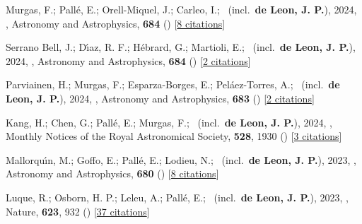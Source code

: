 \item[{\color{numcolor}\scriptsize62}] Murgas, F.; Pall{\'e}, E.; Orell-Miquel, J.; Carleo, I.; \etal\ (incl.\ \textbf{de Leon, J. P.}), 2024, , Astronomy and Astrophysics, \textbf{684} () [\href{https://ui.adsabs.harvard.edu/abs/2024A&A...684A..83M}{8 citations}]

\item[{\color{numcolor}\scriptsize61}] Serrano Bell, J.; D{\'\i}az, R. F.; H{\'e}brard, G.; Martioli, E.; \etal\ (incl.\ \textbf{de Leon, J. P.}), 2024, , Astronomy and Astrophysics, \textbf{684} () [\href{https://ui.adsabs.harvard.edu/abs/2024A&A...684A...6S}{2 citations}]

\item[{\color{numcolor}\scriptsize60}] Parviainen, H.; Murgas, F.; Esparza-Borges, E.; Pel{\'a}ez-Torres, A.; \etal\ (incl.\ \textbf{de Leon, J. P.}), 2024, , Astronomy and Astrophysics, \textbf{683} () [\href{https://ui.adsabs.harvard.edu/abs/2024A&A...683A.170P}{2 citations}]

\item[{\color{numcolor}\scriptsize59}] Kang, H.; Chen, G.; Pall{\'e}, E.; Murgas, F.; \etal\ (incl.\ \textbf{de Leon, J. P.}), 2024, , Monthly Notices of the Royal Astronomical Society, \textbf{528}, 1930 () [\href{https://ui.adsabs.harvard.edu/abs/2024MNRAS.528.1930K}{3 citations}]

\item[{\color{numcolor}\scriptsize58}] Mallorqu{\'\i}n, M.; Goffo, E.; Pall{\'e}, E.; Lodieu, N.; \etal\ (incl.\ \textbf{de Leon, J. P.}), 2023, , Astronomy and Astrophysics, \textbf{680} () [\href{https://ui.adsabs.harvard.edu/abs/2023A&A...680A..76M}{8 citations}]

\item[{\color{numcolor}\scriptsize57}] Luque, R.; Osborn, H. P.; Leleu, A.; Pall{\'e}, E.; \etal\ (incl.\ \textbf{de Leon, J. P.}), 2023, , Nature, \textbf{623}, 932 () [\href{https://ui.adsabs.harvard.edu/abs/2023Natur.623..932L}{37 citations}]

